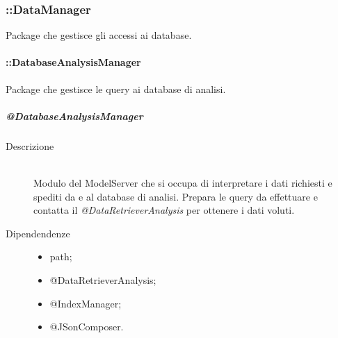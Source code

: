 \subsubsection{::DataManager}
Package che gestisce gli accessi ai database.

\paragraph{::DatabaseAnalysisManager}
Package che gestisce le query ai database di analisi. 

\subparagraph{@DatabaseAnalysisManager}

\begin{description}
 \item[Descrizione] \hfill \\
Modulo del ModelServer che si occupa di interpretare i dati richiesti e spediti da e al database di analisi. 
Prepara le query da effettuare e contatta il \textit{@DataRetrieverAnalysis} per ottenere i dati voluti.
 \item[Dipendendenze] \hfill
 \begin{itemize}
  \item path;
  \item @DataRetrieverAnalysis;
  \item @IndexManager;
  \item @JSonComposer.
 \end{itemize}
 
 

\end{description}
